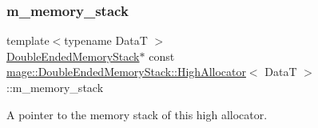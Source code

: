 \subsubsection{\texorpdfstring{m\+\_\+memory\+\_\+stack}{m\_memory\_stack}}
{\footnotesize\ttfamily template$<$typename DataT $>$ \\
\hyperlink{classmage_1_1_double_ended_memory_stack}{Double\+Ended\+Memory\+Stack}$\ast$ const \hyperlink{structmage_1_1_double_ended_memory_stack_1_1_high_allocator}{mage\+::\+Double\+Ended\+Memory\+Stack\+::\+High\+Allocator}$<$ DataT $>$\+::m\+\_\+memory\+\_\+stack\hspace{0.3cm}{\ttfamily [private]}}

A pointer to the memory stack of this high allocator. 